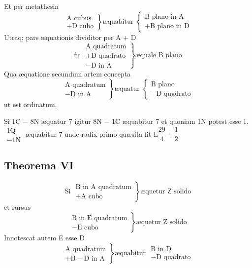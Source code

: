\documentclass[11pt,a4paper]{article}
\begin{document}
Et per metathesin
\[ \left.\begin{array}{l} \text{A cubus} \\ +\text{D cubo} \end{array}\right\} \text{æquabitur } \left\{\begin{array}{l} \text{B plano in A} \\ +\text{B plano in D} \end{array}\right. \]
Utraq; pars æquationis dividitor per A + D
\[ \text{fit } \left.\begin{array}{l} \text{A quadratum} \\ +\text{D quadrato} \\ -\text{D in A} \end{array}\right\} \text{æquale B plano} \]
Qua æquatione secundum artem concepta
\[ \left.\begin{array}{l} \text{A quadratum} \\ -\text{D in A} \end{array}\right\} \text{æquatur } \left\{\begin{array}{l} \text{B plano} \\ -\text{D quadrato} \end{array}\right. \]
ut est ordinatum.

Si 1C $-$ 8N æquatur 7 igitur 8N $-$ 1C æquabitur 7 et quoniam 1N potest esse 1. $\begin{array}{l} \text{1Q} \\ -\text{1N} \end{array}$ æquabitur 7 unde radix primo quæsita fit L$\dfrac{29}{4} + \dfrac{1}{2}$

\subsection*{Theorema VI}

\[ \text{Si } \left.\begin{array}{l} \text{B in A quadratum} \\ +\text{A cubo} \end{array}\right\} \text{æquetur Z solido} \]
et rursus
\[ \left.\begin{array}{l} \text{B in E quadratum} \\ -\text{E cubo} \end{array}\right\} \text{æquetur Z solido} \]
Innotescat autem E esse D
\[ \left.\begin{array}{l} \text{A quadratum} \\ +\text{B} - \text{D in A} \end{array}\right\} \text{æquabitur } \begin{array}{l} \text{B in D} \\ -\text{D quadrato} \end{array} \]
\end{document}

